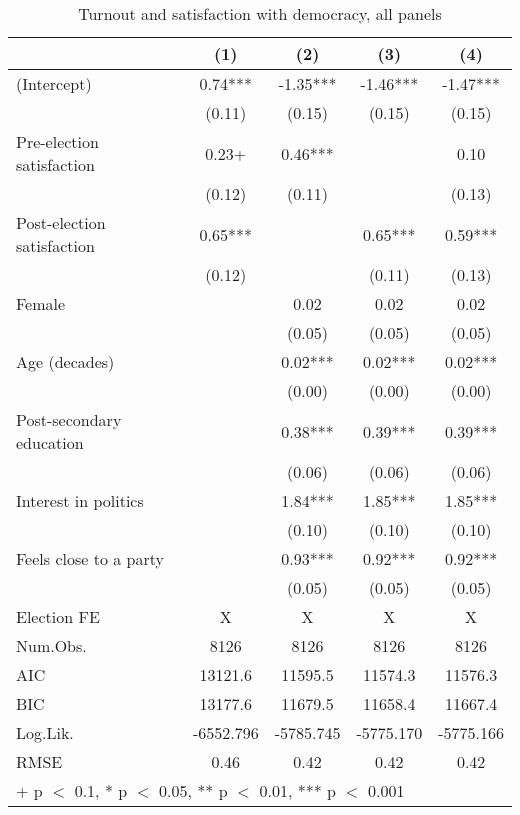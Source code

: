 \begin{table}

\caption{Turnout and satisfaction with democracy, all panels}
\centering
\begin{tabular}[t]{lcccc}
\toprule
  & (1) & (2) & (3) & (4)\\
\midrule
(Intercept) & 0.74*** & -1.35*** & -1.46*** & -1.47***\\
 & (0.11) & (0.15) & (0.15) & (0.15)\\
Pre-election satisfaction & 0.23+ & 0.46*** &  & 0.10\\
 & (0.12) & (0.11) &  & (0.13)\\
Post-election satisfaction & 0.65*** &  & 0.65*** & 0.59***\\
 & (0.12) &  & (0.11) & (0.13)\\
Female &  & 0.02 & 0.02 & 0.02\\
 &  & (0.05) & (0.05) & \vphantom{1} (0.05)\\
Age (decades) &  & 0.02*** & 0.02*** & 0.02***\\
 &  & (0.00) & (0.00) & (0.00)\\
Post-secondary education &  & 0.38*** & 0.39*** & 0.39***\\
 &  & (0.06) & (0.06) & (0.06)\\
Interest in politics &  & 1.84*** & 1.85*** & 1.85***\\
 &  & (0.10) & (0.10) & (0.10)\\
Feels close to a party &  & 0.93*** & 0.92*** & 0.92***\\
 &  & (0.05) & (0.05) & (0.05)\\
\midrule
Election FE & X & X & X & X\\
Num.Obs. & 8126 & 8126 & 8126 & 8126\\
AIC & 13121.6 & 11595.5 & 11574.3 & 11576.3\\
BIC & 13177.6 & 11679.5 & 11658.4 & 11667.4\\
Log.Lik. & -6552.796 & -5785.745 & -5775.170 & -5775.166\\
RMSE & 0.46 & 0.42 & 0.42 & 0.42\\
\bottomrule
\multicolumn{5}{l}{\rule{0pt}{1em}+ p $<$ 0.1, * p $<$ 0.05, ** p $<$ 0.01, *** p $<$ 0.001}\\
\end{tabular}
\end{table}
